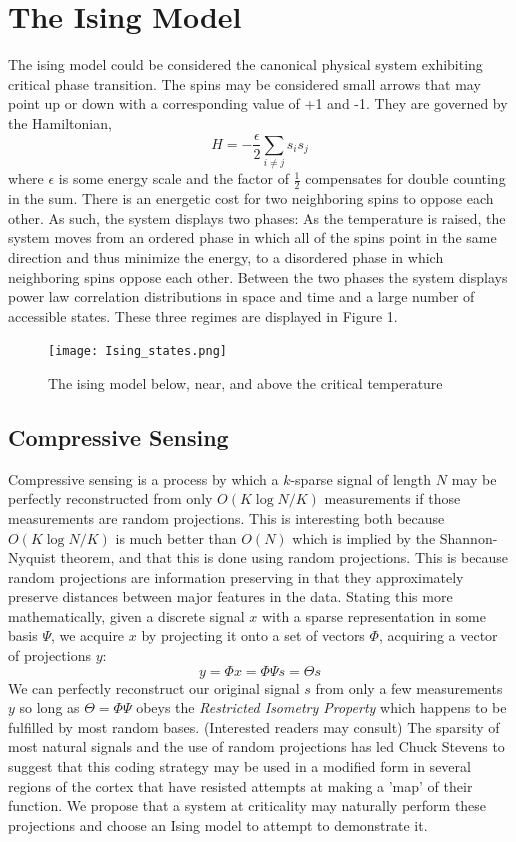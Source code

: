 \documentclass{article} %
\begin{document}
\section{The Ising Model}
The ising model could be considered the canonical physical system exhibiting
critical phase transition.  The spins may be considered small arrows that may
point up or down with a corresponding value of +1 and -1. They are governed by
the Hamiltonian,
\[H = -\frac{\epsilon}{2} \sum_{i\neq j} s_i s_j\]
where $\epsilon$ is some energy scale and the factor of $\frac{1}{2}$
compensates for double counting in the sum.  There is an energetic cost for two
neighboring spins to oppose each other.  As such, the system displays two phases:
As the temperature is raised, the system moves from an ordered phase in which
all of the spins point in the same direction and thus minimize the energy, to a
disordered phase in which neighboring spins oppose each other. Between the two
phases the system displays power law correlation distributions in space and time
and a large number of accessible states.  These three regimes are displayed in
Figure 1.
\begin{figure}[h]
\begin{center}
\texttt{[image: Ising\_states.png]}
\end{center}
\caption{The ising model below, near, and above the critical temperature}
\end{figure}

\subsection{Compressive Sensing}
Compressive sensing is a process by which a $k$-sparse signal of length $N$ may
be perfectly reconstructed from only $O(K\log{N/K})$ measurements if those
measurements are random projections.\cite{Candes2008} This
is interesting both because $O(K\log{N/K})$ is much better than $O(N)$ which is
implied by the Shannon-Nyquist theorem, and that this is done using random
projections.  This is because random projections are information preserving in
that they approximately preserve distances between major features in the data.
Stating this more mathematically, given a discrete signal $x$ with a sparse
representation in some basis $\Psi$, we acquire $x$ by projecting it onto a set
of vectors $\Phi$, acquiring a vector of projections $y$:
\[y = \Phi x = \Phi \Psi s = \Theta s\]
We can perfectly reconstruct our original signal $s$ from only a few
measurements $y$ so long as $\Theta = \Phi\Psi$ obeys the \emph{Restricted
Isometry Property} which happens to be fulfilled by most random bases.
(Interested readers may consult\cite{Candes2008}\cite{Baraniuk2007}) The sparsity of
most natural signals and the use of random projections has led Chuck Stevens to
suggest that this coding strategy may be used in a modified form in several
regions of the cortex that have resisted attempts at making a 'map' of their
function.  We propose that a system at criticality may naturally perform these
projections and choose an Ising model to attempt to demonstrate it.
\end{document}
